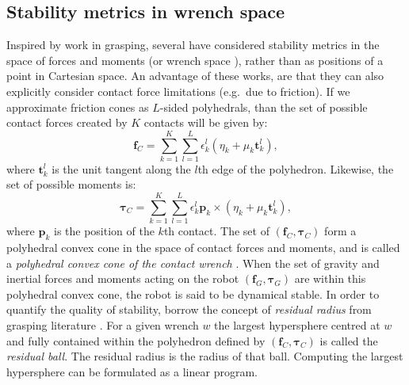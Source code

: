 \documentclass[12pt,a4paper,twoside]{article}
\newcommand{\vvc}[1]{{\bm{#1}}}
\begin{document}
\subsection{Stability metrics in wrench space}
Inspired by work in grasping, several have considered stability metrics in the space of forces and moments (or wrench space \cite{Takao}), rather than as positions of a point in Cartesian space. An advantage of these works, are that they can also explicitly  consider contact force limitations (e.g.\ due to friction). If we approximate friction cones as $L$-sided polyhedrals, than the set of possible contact forces created by $K$ contacts will be given by:
\begin{equation}
\vvc{f}_C = \sum\limits_{k=1}^{K}\sum\limits_{l=1}^{L}\epsilon_k^l (\eta_k + \mu_k \vvc{t}_k^l),
\end{equation}
where $\vvc{t}_k^l$ is the unit tangent along the $l$th edge of the polyhedron. Likewise, the set of possible moments is:
\begin{equation}
\vvc{\tau}_C = \sum\limits_{k=1}^{K}\sum\limits_{l=1}^{L}\epsilon_k^l\vvc{p}_k \times (\eta_k + \mu_k \vvc{t}_k^l),
\end{equation}
where $\vvc{p}_k$ is the position of the $k$th contact. The set of $(\vvc{f}_C,\vvc{\tau}_C)$ form a polyhedral convex cone in the space of contact forces and moments, and is called a \emph{polyhedral convex cone of the contact wrench} \cite{Hirukawa}. When the set of gravity and inertial forces and moments acting on the robot $(\vvc{f}_G,\vvc{\tau}_G)$ are within this polyhedral convex cone, the robot is said to be dynamical stable.  In order to quantify the quality of stability, \cite{barth2008} borrow the concept of \emph{residual radius} from grasping literature \cite{Kirkpatrick1992}. For a given wrench $w$ the largest hypersphere centred at $w$ and fully contained within the polyhedron defined by $(\vvc{f}_C,\vvc{\tau}_C)$ is called the \emph{residual ball}. The residual radius is the radius of that ball. Computing the largest hypersphere can be formulated as a linear program. 
\end{document}
